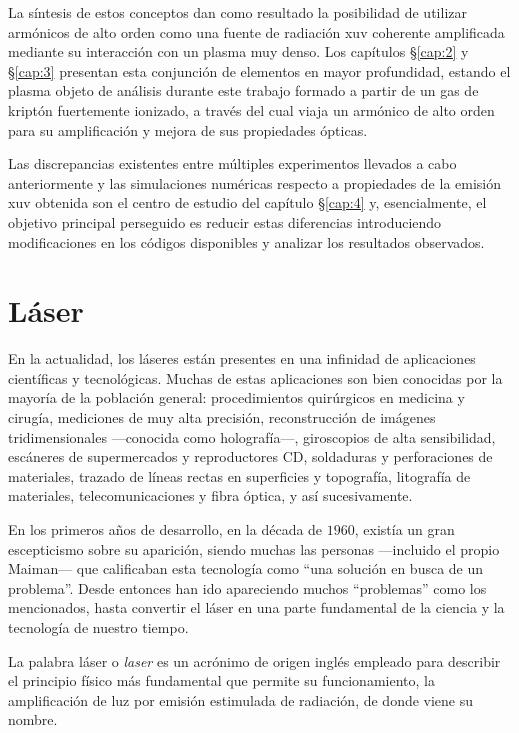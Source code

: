 \begin{itemize}
\end{itemize}

La síntesis de estos conceptos dan como resultado la posibilidad de utilizar armónicos de alto orden como una fuente de radiación \acrshort{xuv} coherente amplificada mediante su interacción con un plasma muy denso. Los capítulos \S\ref{cap:2} y \S\ref{cap:3} presentan esta conjunción de elementos en mayor profundidad, estando el plasma objeto de análisis durante este trabajo formado a partir de un gas de kriptón fuertemente ionizado, a través del cual viaja un armónico de alto orden para su amplificación y mejora de sus propiedades ópticas. 

Las discrepancias existentes entre múltiples experimentos llevados a cabo anteriormente y las simulaciones numéricas respecto a propiedades de la emisión \acrshort{xuv} obtenida son el centro de estudio del capítulo \S\ref{cap:4} y, esencialmente, el objetivo principal perseguido es reducir estas diferencias introduciendo modificaciones en los códigos disponibles y analizar los resultados observados.

\section{Láser}\label{sec:1.1}
En la actualidad, los láseres están presentes en una infinidad de aplicaciones científicas y tecnológicas. Muchas de estas aplicaciones son bien conocidas por la mayoría de la población general: procedimientos quirúrgicos en medicina y cirugía, mediciones de muy alta precisión, reconstrucción de imágenes tridimensionales ---conocida como holografía---, giroscopios de alta sensibilidad, escáneres de supermercados y reproductores CD, soldaduras y perforaciones de materiales, trazado de líneas rectas en superficies y topografía, litografía de materiales, telecomunicaciones y fibra óptica, y así sucesivamente.

En los primeros años de desarrollo, en la década de $1960$, existía un gran escepticismo sobre su aparición, siendo muchas las personas ---incluido el propio Maiman--- que calificaban esta tecnología como \enquote{una solución en busca de un problema}. Desde entonces han ido apareciendo muchos \enquote{problemas} como los mencionados, hasta convertir el láser en una parte fundamental de la ciencia y la tecnología de nuestro tiempo.  

La palabra láser o \emph{\acrfull{laser}} es un acrónimo de origen inglés empleado para describir el principio físico más fundamental que permite su funcionamiento, la amplificación de luz por emisión estimulada de radiación, de donde viene su nombre.

